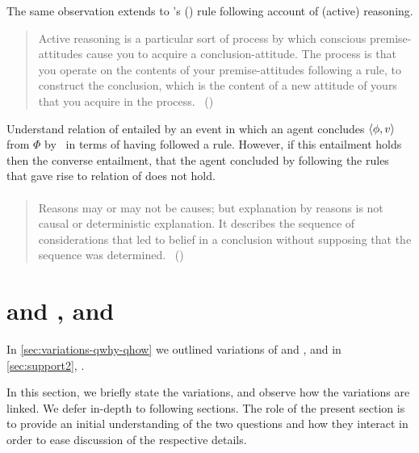 \begin{note}
  The same observation extends to \citeauthor{Broome:2002aa}'s (\citeyear{Broome:2013aa}) rule following account of (active) reasoning.

  \begin{quote}
    Active reasoning is a particular sort of process by which conscious premise-attitudes cause you to acquire a conclusion-attitude.
    The process is that you operate on the contents of your premise-attitudes following a rule, to construct the conclusion, which is the content of a new attitude of yours that you acquire in the process.\newline
    \mbox{ }\hfill\mbox{(\citeyear[234]{Broome:2002aa})}
  \end{quote}

  Understand relation of \support{} entailed by an event in which an agent concludes \(\langle \phi, v \rangle\) from \(\Phi\) by~\supportI{} in terms of having followed a rule.
  However, if this entailment holds then the converse entailment, that the agent concluded by following the rules that gave rise to relation of \support{} does not hold.
\end{note}

\paragraph{\textcite{Harman:1973ww}}

\begin{quote}
  Reasons may or may not be causes; but explanation by reasons is not causal or deterministic explanation.
  It describes the sequence of considerations that led to belief in a conclusion without supposing that the sequence was determined.%
  \mbox{ }\hfill\mbox{(\citeyear[52]{Harman:1973ww})}
\end{quote}

\section{\qWhyV{} and \qHowV{}, and \issueConstraint{}}
\label{sec:qwhyv-qhowv}

\begin{note}
  In \autoref{sec:variations-qwhy-qhow} we outlined variations of \qWhy{} and \qHow{}, and in \autoref{sec:support2}, \support{}.

  In this section, we briefly state the variations, and observe how the variations are linked.
  We defer in-depth to following sections.
  The role of the present section is to provide an initial understanding of the two questions and how they interact in order to ease discussion of the respective details.
\end{note}

